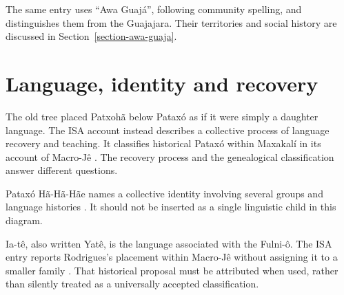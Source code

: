 The same entry uses ``Awa Guajá'',
following community spelling, and
distinguishes them from the Guajajara.
Their territories and social history
are discussed in
Section~\ref{section-awa-guaja}.

\section{Language, identity and recovery}
\label{section-language-recovery}

The old tree placed Patxohã below Pataxó
as if it were simply a daughter language.
The ISA account instead describes a
collective process of language recovery
and teaching. It classifies historical
Pataxó within Maxakalí in its account
of Macro-Jê \cite{isa-pataxo}.
The recovery process and the genealogical
classification answer different questions.

Pataxó Hã-Hã-Hãe names a collective
identity involving several groups and
language histories \cite{isa-pataxo-hahahae}.
It should not be inserted as a single
linguistic child in this diagram.

Ia-tê, also written Yatê, is the language
associated with the Fulni-ô. The ISA entry
reports Rodrigues's placement within
Macro-Jê without assigning it to a smaller
family \cite{isa-fulni-o}.
That historical proposal must be attributed
when used, rather than silently treated
as a universally accepted classification.






